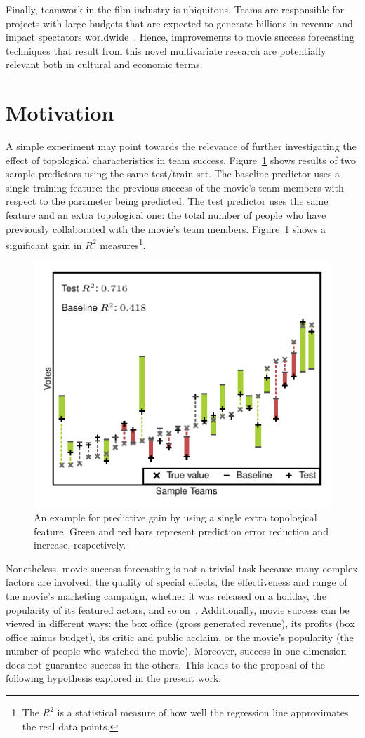 Finally, teamwork in the film industry is ubiquitous. Teams are responsible for
projects with large budgets that are expected to generate billions in revenue
and impact spectators worldwide~\citep{Ghiassi2015}. Hence, improvements to
movie success forecasting techniques that result from this novel multivariate
research are potentially relevant both in cultural and economic terms.

\section{Motivation}
A simple experiment may point towards the relevance of further investigating
the effect of topological characteristics in team success.
Figure~\ref{fig:pred_intro} shows results of two sample predictors using the
same test/train set. The baseline predictor uses a single training feature: the
previous success of the movie's team members with respect to the parameter
being predicted. The test predictor uses the same feature and an extra
topological one: the total number of people who have previously collaborated
with the movie's team members. Figure~\ref{fig:pred_intro} shows a significant
gain in $R^2$ measures\footnote{The $R^2$  is a  statistical measure of how
well the regression line approximates the real data points.}.

\begin{figure}[tb]\begin{center}
\includegraphics[width=0.6\columnwidth]{../../images/pred_intro2.pdf}
\caption{\label{fig:pred_intro}An example for predictive gain by using a single
extra topological feature. Green and red bars represent prediction error
reduction and increase, respectively.}
\end{center}\end{figure}

Nonetheless, movie success forecasting is not a trivial task because many
complex factors are involved: the quality of special effects, the effectiveness
and range of the movie's marketing campaign, whether it was released on a
holiday, the popularity of its featured actors, and so
on~\citep{elberse2007power,Ghiassi2015}. Additionally, movie success can be
viewed in different ways: the box office (gross generated revenue), its profits
(box office minus budget), its critic and public acclaim, or the movie's
popularity (the number of people who watched the movie). Moreover, success in
one dimension does not guarantee success in the others. This leads to the
proposal of the following hypothesis explored in the present work:

